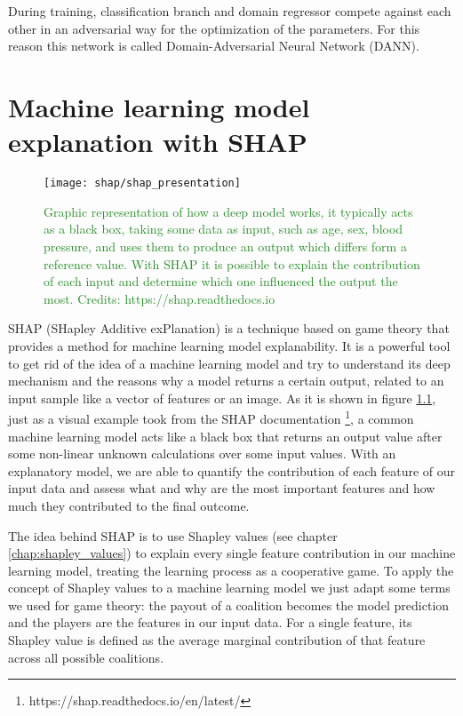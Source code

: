 \documentclass[11pt]{report}
\begin{document}
During training, classification branch and domain regressor compete against each other in an adversarial way for the optimization of the parameters. For this reason this network is called Domain-Adversarial Neural Network (DANN).



\chapter{Machine learning model explanation with SHAP}\label{chap:shap}


\begin{figure}[h]
\centering
\texttt{[image: shap/shap\_presentation]}
\caption{\textcolor{ForestGreen}{Graphic representation of how a deep model works, it typically acts as a black box, taking some data as input, such as age, sex, blood pressure, and uses them to produce an output which differs form a reference value. With SHAP it is possible to explain the contribution of each input and determine which one influenced the output the most. Credits: https://shap.readthedocs.io}}
\label{fig:shap_waterfall_example}
\end{figure}

SHAP (SHapley Additive exPlanation) is a technique based on game theory that provides a method for machine learning model explanability.
It is a powerful tool to get rid of the  idea of a machine learning model and try to understand its deep mechanism and the reasons why a model returns a certain output, related to an input sample like a vector of features or an image.
As it is shown in figure \ref{fig:shap_waterfall_example}, just as a visual example took from the SHAP documentation \footnote{https://shap.readthedocs.io/en/latest/}, a common machine learning model acts like a black box that returns an output value after some non-linear unknown calculations over some input values. With an explanatory model, we are able to quantify the contribution of each feature of our input data and assess what and why are the most important features and how much they contributed to the final outcome.

The idea behind SHAP is to use Shapley values (see chapter \ref{chap:shapley_values}) to explain every single feature contribution in our machine learning model, treating the learning process as a cooperative game.
To apply the concept of Shapley values to a machine learning model we just adapt some terms we used for game theory: the payout of a coalition becomes the model prediction and the players are the features in our input data.
For a single feature, its Shapley value is defined as the average marginal contribution of that feature across all possible coalitions.
\end{document}
